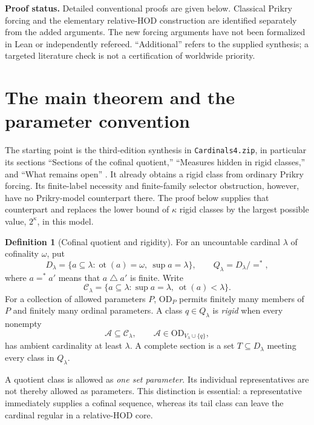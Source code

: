 \documentclass[11pt,letterpaper]{article}
\theoremstyle{definition}
\newtheorem{definition}{Definition}[section]
\numberwithin{equation}{section}
\newcommand{\OD}{\mathrm{OD}}
\newcommand{\ot}{\operatorname{ot}}
\begin{document}
\textbf{Proof status.} Detailed conventional proofs are given below. Classical Prikry forcing and the elementary relative-HOD construction are identified separately from the added arguments. The new forcing arguments have not been formalized in Lean or independently refereed. ``Additional'' refers to the supplied synthesis; a targeted literature check is not a certification of worldwide priority.

\newpage
\tableofcontents
\vspace{8pt}

\section{The main theorem and the parameter convention}\label{sec:main}

The starting point is the third-edition synthesis in \texttt{Cardinals4.zip}, in particular its sections ``Sections of the cofinal quotient,'' ``Measures hidden in rigid classes,'' and ``What remains open'' \cite{synthesis}. It already obtains a rigid class from ordinary Prikry forcing. Its finite-label necessity and finite-family selector obstruction, however, have no Prikry-model counterpart there. The proof below supplies that counterpart and replaces the lower bound of $\kappa$ rigid classes by the largest possible value, $2^\kappa$, in this model.

\begin{definition}[Cofinal quotient and rigidity]\label{def:quotient}
For an uncountable cardinal $\lambda$ of cofinality $\omega$, put
\[
 D_\lambda=\{a\subseteq\lambda:\ot(a)=\omega,\ \sup a=\lambda\},\qquad
 Q_\lambda=D_\lambda/=^*,
\]
where $a=^*a'$ means that $a\mathbin\triangle a'$ is finite. Write
\[
 \mathcal C_\lambda=\{a\subseteq\lambda:\sup a=\lambda,\ \ot(a)<\lambda\}.
\]
For a collection of allowed parameters $P$, $\OD_P$ permits finitely many members of $P$ and finitely many ordinal parameters. A class $q\in Q_\lambda$ is \emph{rigid} when every nonempty
\[
 \mathcal A\subseteq\mathcal C_\lambda,
 \qquad \mathcal A\in\OD_{V_\lambda\cup\{q\}},
\]
has ambient cardinality at least $\lambda$. A complete section is a set $T\subseteq D_\lambda$ meeting every class in $Q_\lambda$.
\end{definition}

A quotient class is allowed as \emph{one set parameter}. Its individual representatives are not thereby allowed as parameters. This distinction is essential: a representative immediately supplies a cofinal sequence, whereas its tail class can leave the cardinal regular in a relative-HOD core.
\end{document}
